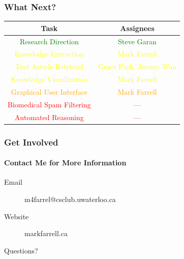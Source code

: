 \documentclass[mathserif, aspectratio=169]{beamer}
\begin{document}
\begin{frame}

\frametitle{What Next?}

\centering

\begin{tabular}{c | c}
Task &  Assignees\\
\hline
\textcolor{green}{Research Direction} & \textcolor{green}{Steve Garan} \\
\textcolor{yellow}{Knowledge Extraction} & \textcolor{yellow}{Mark Farrell} \\
\textcolor{yellow}{Text Article Retrieval} & \textcolor{yellow}{Grace Park, Jeremy Wan} \\
\textcolor{yellow}{Knowledge Visualization} & \textcolor{yellow}{Mark Farrell} \\
\textcolor{orange}{Graphical User Interface} & \textcolor{orange}{Mark Farrell} \\
\textcolor{red}{Biomedical Spam Filtering} & \textcolor{red}{---} \\
\textcolor{red}{Automated Reasoning} & \textcolor{red}{---} \\
\end{tabular}

\end{frame}

\begin{frame}

\frametitle{Get Involved}
\framesubtitle{Contact Me for More Information}

\begin{description}
\item[Email] m4farrel@csclub.uwaterloo.ca
\item[Website] markfarrell.ca
\end{description}

\end{frame}

\begin{frame}[plain]
\centering
Questions?
\end{frame}
\end{document}
